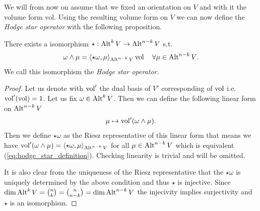 \documentclass[../master_thesis.tex]{subfiles}
\begin{document}
We will from now on assume that we fixed an orientation on $V$ and with it 
the volume form vol. 
Using the resulting volume form on $V$
we can now define the \textit{Hodge star operator} with the following 
proposition.
\begin{proposition}
    There exists a isomorphism $\star: {\text{Alt}^{k}\,V} 
    \rightarrow {\text{Alt}^{n-k}\,V}$ s.t. 
    \begin{align}
        \omega \wedge \mu = \langle \star \omega, \mu \rangle_{{\text{Alt}^{n-k}\,V}}
        \operatorname{vol} \quad \forall \mu \in {\text{Alt}^{n-k}\,V}.
        \label{eq:hodge_star_definition}            
    \end{align}
    We call this isomorphism the \textit{Hodge star operator}.
\end{proposition}
\begin{proof}
    Let us denote with $\operatorname{vol}'$ the dual basis of $V'$ corresponding of $\operatorname{vol}$ i.e.
    $\operatorname{vol}'(\operatorname{vol}) = 1$. Let us fix $\omega \in {\text{Alt}^{k}\,V}$. 
    Then we can define the following linear form on $
    {\text{Alt}^{n-k}\,V}$
    \begin{align*}
        \mu \mapsto \operatorname{vol}' (\omega \wedge \mu).
    \end{align*}
    Then we define
    $\star \omega$ as the Riesz representative of this linear form that means we 
    have $\operatorname{vol}'(\omega \wedge \mu) = 
    \langle \star \omega, \mu \rangle_{{\text{Alt}^{n-k}\,V}}$ for all 
    $\mu \in {\text{Alt}^{n-k}\,V}$ which is equivalent (\ref{eq:hodge_star_definition}).
    Checking linearity is trivial and will be omitted.

    It is also clear from the uniqueness of the Riesz representative that 
    the $\star\omega$ is uniquely determined by the above condition and 
    thus $\star$ is injective. Since $\dim {\text{Alt}^{k}\,V} = 
    \binom{n}{k} = \binom{n}{n-k} = \dim {\text{Alt}^{n-k}\,V}$ the injecivity 
    implies surjectivity and $\star$ is an isomorphism.
\end{proof}
\end{document}
